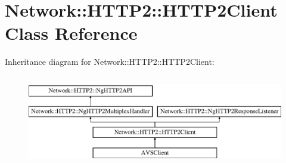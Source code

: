 \hypertarget{classNetwork_1_1HTTP2_1_1HTTP2Client}{}\section{Network\+:\+:H\+T\+T\+P2\+:\+:H\+T\+T\+P2\+Client Class Reference}
\label{classNetwork_1_1HTTP2_1_1HTTP2Client}
Inheritance diagram for Network\+:\+:H\+T\+T\+P2\+:\+:H\+T\+T\+P2\+Client\+:\begin{figure}[H]
\begin{center}
\leavevmode
\includegraphics[height=4.000000cm]{de/d9b/classNetwork_1_1HTTP2_1_1HTTP2Client}
\end{center}
\end{figure}
